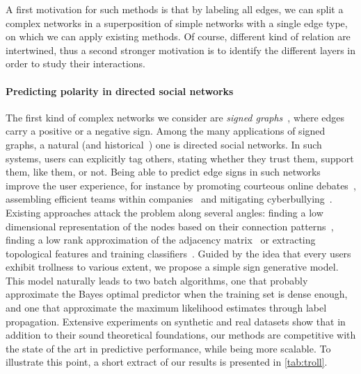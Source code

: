 A first motivation for such methods is that by labeling all edges, we can split a complex networks
in a superposition
of simple networks with a single edge type, on which we can apply existing methods. Of course,
different kind of relation are intertwined, thus a second stronger motivation is to identify the
different layers in order to study their interactions.

\vspace{-\baselineskip}
\paragraph{Predicting polarity in directed social networks}

The first kind of complex networks we consider are \emph{signed graphs}~\autocite{Tang2015a},
where edges carry a positive or a negative sign. Among the many applications of signed graphs, a
natural (and historical~\autocite{harary1953}) one is directed social networks. In such systems,
users can explicitly tag others, stating whether they trust them, support them, like them, or not.
Being able to predict edge signs in such networks improve the user experience, for instance by
promoting courteous online debates~\autocite{journalism15}, assembling efficient teams within
companies~\autocite{MLinHR16} and mitigating cyberbullying~\autocite{cyberbullying13}. Existing
approaches attack the problem along several angles: finding a low dimensional representation of the
nodes based on their connection patterns~\autocites{SIGNet17}{SNE17}, finding a low rank approximation
of the adjacency matrix~\autocites{LowRankCompletion14}{OnlineCompletion17} or extracting
topological features and training classifiers~\autocites{Leskovec2010}{Bayesian15}{wu2016troll}.
Guided by the idea that every users exhibit trollness to various extent, we propose a simple sign
generative model. This model naturally leads to two batch algorithms, one that probably approximate the
Bayes optimal predictor when the training set is dense enough, and one that approximate the maximum
likelihood estimates through label propagation. Extensive experiments on synthetic and real datasets
show that in addition to their sound theoretical foundations, our methods are competitive with the
state of the art in predictive performance, while being more scalable. To illustrate this point, a
short extract of our results is presented in \autoref{tab:troll}.

